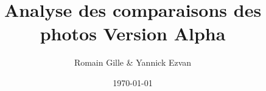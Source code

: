 



\title{Analyse des comparaisons des photos Version Alpha}
\author{Romain Gille \& Yannick Ezvan}
\date{\today}
\maketitle
\tableofcontents

\newpage

\newpage

\newpage

\newpage

\newpage

\newpage

\newpage

\newpage

\newpage

\newpage

\newpage

\newpage


